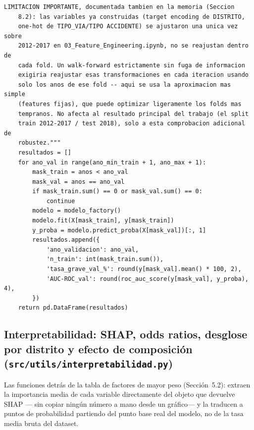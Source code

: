 \documentclass[11pt,a4paper]{article}
\begin{document}
\begin{lstlisting}[caption={Estabilidad del bagging, comparación temporal vs. aleatoria, y validación de ventana expansiva.}]
    LIMITACION IMPORTANTE, documentada tambien en la memoria (Seccion
    8.2): las variables ya construidas (target encoding de DISTRITO,
    one-hot de TIPO_VIA/TIPO ACCIDENTE) se ajustaron una unica vez sobre
    2012-2017 en 03_Feature_Engineering.ipynb, no se reajustan dentro de
    cada fold. Un walk-forward estrictamente sin fuga de informacion
    exigiria reajustar esas transformaciones en cada iteracion usando
    solo los anos de ese fold -- aqui se usa la aproximacion mas simple
    (features fijas), que puede optimizar ligeramente los folds mas
    tempranos. No afecta al resultado principal del trabajo (el split
    train 2012-2017 / test 2018), solo a esta comprobacion adicional de
    robustez."""
    resultados = []
    for ano_val in range(ano_min_train + 1, ano_max + 1):
        mask_train = anos < ano_val
        mask_val = anos == ano_val
        if mask_train.sum() == 0 or mask_val.sum() == 0:
            continue
        modelo = modelo_factory()
        modelo.fit(X[mask_train], y[mask_train])
        y_proba = modelo.predict_proba(X[mask_val])[:, 1]
        resultados.append({
            'ano_validacion': ano_val,
            'n_train': int(mask_train.sum()),
            'tasa_grave_val_%': round(y[mask_val].mean() * 100, 2),
            'AUC-ROC_val': round(roc_auc_score(y[mask_val], y_proba), 4),
        })
    return pd.DataFrame(resultados)
\end{lstlisting}

\subsection{Interpretabilidad: SHAP, odds ratios, desglose por distrito y efecto de composición (\texttt{src/utils/interpretabilidad.py})}
\label{app:interpretabilidad}

Las funciones detrás de la tabla de factores de mayor peso (Sección~5.2): extraen la importancia media de cada variable directamente del objeto que devuelve SHAP --- sin copiar ningún número a mano desde un gráfico--- y la traducen a puntos de probabilidad partiendo del punto base real del modelo, no de la tasa media bruta del dataset.
\end{document}
